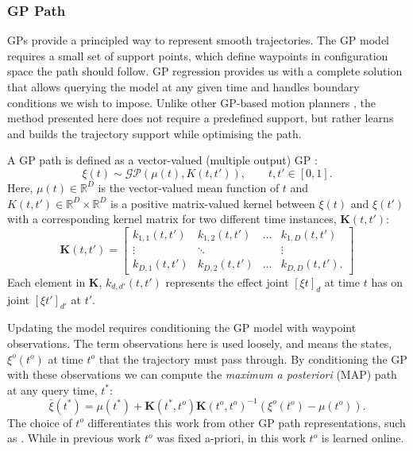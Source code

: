 \documentclass[letterpaper, 10 pt, conference]{ieeeconf}  %
\begin{document}

\subsubsection{GP Path}

GPs provide a principled way to represent smooth trajectories. The GP model requires a small set of support points, which define waypoints in configuration space the path should follow. GP regression provides us with a complete solution that allows querying the model at any given time and handles boundary conditions we wish to impose. Unlike other GP-based motion planners \cite{mukadam2016gaussian,Dong2016}, the method presented here does not require a predefined support, but rather learns and builds the trajectory support while optimising the path.

A GP path is defined as a vector-valued (multiple output) GP \cite{Alvarez2011}: 
\begin{equation}
\xi(t) \sim \mathcal{GP}(\mu(t), {K}(t,t')), \qquad t,t' \in [0,1].
\end{equation}   
Here, $\mu(t) \in \mathbb{R}^D$ is the vector-valued mean function of $t$ and ${K}(t,t') \in \mathbb{R}^D \times \mathbb{R}^D$ is a positive matrix-valued kernel between $\xi(t)$ and $\xi(t')$ with a corresponding kernel matrix for two different time instances, $\boldsymbol{K}(t,t')$:
\begin{equation}
\boldsymbol{K}(t,t')=
\begin{bmatrix}
k_{1,1}(t,t') & k_{1,2}(t,t') & \dots & k_{1,D}(t,t')\\
\vdots & \ddots &  & \vdots\\
k_{D,1}(t,t') & k_{D,2}(t,t') & \dots & k_{D,D}(t,t').
\end{bmatrix}
\end{equation}
Each element in $\boldsymbol{K}$, $k_{d,d'}(t,t')$ represents the effect joint $[\xi{t}]_d$ at time $t$ has on joint $[\xi{t'}]_{d'}$ at $t'$.

Updating the model requires conditioning the GP model with waypoint observations. The term observations here is used loosely, and means the states, $\xi^o(t^o)$ at time $t^o$ that the trajectory must pass through. By conditioning the GP with these observations we can compute the \textit{maximum a posteriori} (MAP) path at any query time, $t^*$:
\begin{equation}\label{eq:GP_posterior}
	\bar{\xi}(t^*) = \mu(t^*) + \boldsymbol{K}(t^*,t^o)\boldsymbol{K}(t^o,t^o)^{-1}(\xi^o(t^o)-\mu(t^o)).
\end{equation}
The choice of $t^o$ differentiates this work from other GP path representations, such as \cite{mukadam2016gaussian,Dong2016}. While in previous work $t^o$ was fixed a-priori, in this work $t^o$ is learned online. 
\end{document}

